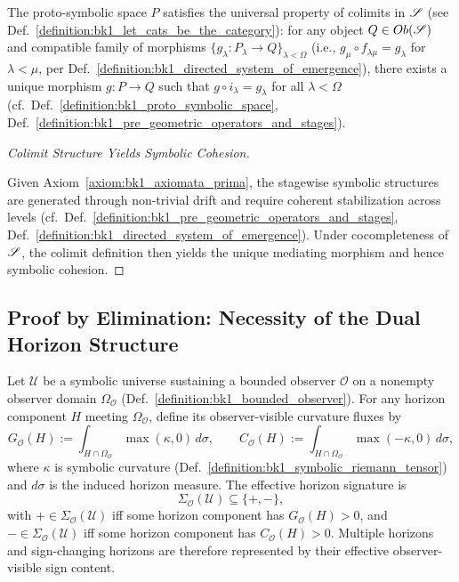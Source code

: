 \begin{lemma}
\label{lemma:bk1_universality_of_proto_symbolic_space}
The proto-symbolic space $P$ satisfies the universal property of colimits in $\mathscr{S}$ (see Def.~\ref{definition:bk1_let_cats_be_the_category}): for any object $Q \in Ob(\mathscr{S})$ and compatible family of morphisms $\{g_\lambda: P_\lambda \to Q\}_{\lambda < \Omega}$ (i.e., $g_\mu \circ f_{\lambda\mu} = g_\lambda$ for $\lambda < \mu$, per Def.~\ref{definition:bk1_directed_system_of_emergence}), there exists a unique morphism $g: P \to Q$ such that $g \circ i_\lambda = g_\lambda$ for all $\lambda < \Omega$ (cf.~Def.~\ref{definition:bk1_proto_symbolic_space}, Def.~\ref{definition:bk1_pre_geometric_operators_and_stages}).
\begin{proof}[Colimit Structure Yields Symbolic Cohesion]
\label{proof:bk1_colimit_yields_categoric_structure}
\leavevmode

Given Axiom~\ref{axiom:bk1_axiomata_prima}, the stagewise symbolic structures are generated through non-trivial drift and require coherent stabilization across levels (cf.~Def.~\ref{definition:bk1_pre_geometric_operators_and_stages}, Def.~\ref{definition:bk1_directed_system_of_emergence}). Under cocompleteness of $\mathscr{S}$, the colimit definition then yields the unique mediating morphism and hence symbolic cohesion.
\end{proof}
\end{lemma}
\subsection{Proof by Elimination: Necessity of the Dual Horizon Structure}
\label{subsec:bk1_necessity_of_the_dual_horizon_structure}

\begin{definition}
\label{definition:bk1_effective_horizon_signature}
Let $\mathcal{U}$ be a symbolic universe sustaining a bounded observer
\(\mathcal{O}\) on a nonempty observer domain \(\Omega_{\mathcal{O}}\)
(Def.~\ref{definition:bk1_bounded_observer}). For any horizon component
\(H\) meeting \(\Omega_{\mathcal{O}}\), define its observer-visible curvature
fluxes by
\[
G_{\mathcal{O}}(H)
  :=\int_{H\cap\Omega_{\mathcal{O}}}\max(\kappa,0)\,d\sigma,
\qquad
C_{\mathcal{O}}(H)
  :=\int_{H\cap\Omega_{\mathcal{O}}}\max(-\kappa,0)\,d\sigma,
\]
where \(\kappa\) is symbolic curvature
(Def.~\ref{definition:bk1_symbolic_riemann_tensor}) and \(d\sigma\) is the
induced horizon measure. The effective horizon signature is
\[
\Sigma_{\mathcal{O}}(\mathcal{U})
\subseteq \{+,-\},
\]
with \(+\in\Sigma_{\mathcal{O}}(\mathcal{U})\) iff some horizon component has
\(G_{\mathcal{O}}(H)>0\), and
\(-\in\Sigma_{\mathcal{O}}(\mathcal{U})\) iff some horizon component has
\(C_{\mathcal{O}}(H)>0\). Multiple horizons and sign-changing horizons are
therefore represented by their effective observer-visible sign content.
\end{definition}

